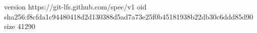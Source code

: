 version https://git-lfs.github.com/spec/v1
oid sha256:f8cfda1c94480418d2d130388d5ad7a73e25f0b45181938b22db30c6ddd85d90
size 41290
